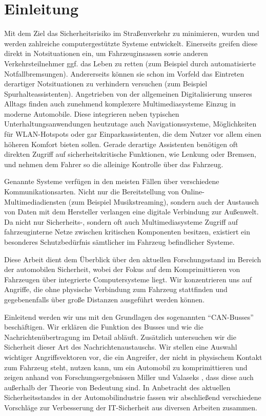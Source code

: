 \documentclass[
    fontsize=12pt,
    headings=small,
    parskip=half,           %
    bibliography=totoc,
    numbers=noenddot,       %
    open=any,               %
    ]{scrreprt}
\begin{document}
\chapter{Einleitung}
Mit dem Ziel das Sicherheitsrisiko im Straßenverkehr zu minimieren, wurden und werden zahlreiche computergestützte Systeme entwickelt. Einerseits greifen diese direkt in Notsituationen ein, um Fahrzeuginsassen sowie anderen Verkehrsteilnehmer ggf. das Leben zu retten (zum Beispiel durch automatisierte Notfallbremsungen). Andererseits können sie schon im Vorfeld das Eintreten derartiger Notsituationen zu verhindern versuchen (zum Beispiel Spurhalteassistenten). Angetrieben von der allgemeinen Digitalisierung unseres Alltags finden auch zunehmend komplexere Multimediasysteme Einzug in moderne Automobile. Diese integrieren neben typischen Unterhaltungsanwendungen heutzutage auch Navigationssysteme, Möglichkeiten für WLAN-Hotspots oder gar Einparkassistenten, die dem Nutzer vor allem einen höheren Komfort bieten sollen. Gerade derartige Assistenten benötigen oft direkten Zugriff auf sicherheitskritische Funktionen, wie Lenkung oder Bremsen, und nehmen dem Fahrer so die alleinige Kontrolle über das Fahrzeug. \par
Genannte Systeme verfügen in den meisten Fällen über verschiedene Kommunikationsarten. Nicht nur die Bereitstellung von Online-Multimediadiensten (zum Beispiel Musikstreaming), sondern auch der Austausch von Daten mit dem Hersteller verlangen eine digitale Verbindung zur Außenwelt. Da nicht nur Sicherheits-, sondern oft auch Multimediasysteme Zugriff auf fahrzeuginterne Netze zwischen kritischen Komponenten besitzen, existiert ein besonderes Schutzbedürfnis sämtlicher im Fahrzeug befindlicher Systeme. \par
Diese Arbeit dient dem Überblick über den aktuellen Forschungsstand im Bereich der automobilen Sicherheit, wobei der Fokus auf dem Komprimittieren von Fahrzeugen über integrierte Computersysteme liegt. Wir konzentrieren uns auf Angriffe, die ohne physische Verbindung zum Fahrzeug stattfinden und gegebenenfalls über große Distanzen ausgeführt werden können. \par
Einleitend werden wir uns mit den Grundlagen des sogenannten "`CAN-Busses"' beschäftigen. Wir erklären die Funktion des Busses und wie die Nachrichtenübertragung im Detail abläuft. Zusätzlich untersuchen wir die Sicherheit dieser Art des Nachrichtenaustauschs. Wir stellen eine Auswahl wichtiger Angriffsvektoren vor, die ein Angreifer, der nicht in physischem Kontakt zum Fahrzeug steht, nutzen kann, um ein Automobil zu komprimittieren und zeigen anhand von Forschungsergebnissen Miller und Valaseks \cite{MiV15}, dass diese auch außerhalb der Theorie von Bedeutung sind. In Anbetracht des aktuellen Sicherheitsstandes in der Automobilindustrie fassen wir abschließend verschiedene Vorschläge zur Verbesserung der IT-Sicherheit aus diversen Arbeiten zusammen.
\end{document}

